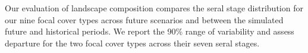 \documentclass[12pt]{article}
\begin{document}
\begin{spacing}{1}
Our evaluation of landscape composition compares the seral stage distribution for our nine focal cover types across future scenarios and between the simulated future and historical periods. We report the 90\% range of variability and assess departure for the two focal cover types across their seven seral stages.





\end{spacing}
\end{document}
